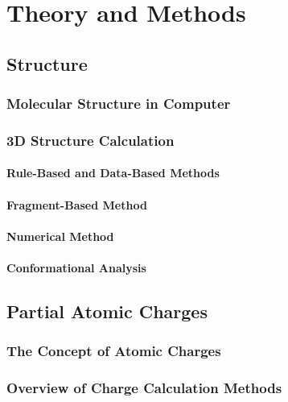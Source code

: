 \part{Theory and Methods}
\label{part:theory}

\chapter{Structure}

\section{Molecular Structure in Computer}

\section{3D Structure Calculation}

\subsection{Rule-Based and Data-Based Methods}

\subsection{Fragment-Based Method}

\subsection{Numerical Method}

\subsection{Conformational Analysis}

\chapter{Partial Atomic Charges}

\section{The Concept of Atomic Charges}

\section{Overview of Charge Calculation Methods}

